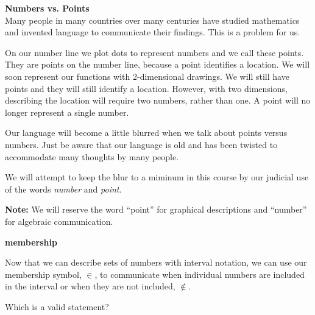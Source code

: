 \documentclass{ximera}
\begin{document}
\begin{warning}  \textbf{\textcolor{red!80!black}{Numbers vs. Points}} \\

Many people in many countries over many centuries have studied mathematics and invented language to communicate their findings. This is a problem for us.

On our number line we plot dots to represent numbers and we call these points.  They are points on the number line, because a point identifies a location.  We will soon represent our functions with 2-dimensional drawings. We will still have points and they will still identify a location.  However, with two dimensions, describing the location will require two numbers, rather than one.  A point will no longer represent a single number.

Our language will become a little blurred when we talk about points versus numbers.  Just be aware that our language is old and has been twisted to accommodate many thoughts by many people.


We will attempt to keep the blur to a miminum in this course by our judicial use of the words \textit{number} and \textit{point}.

\textbf{Note:} We will reserve the word ``point'' for graphical descriptions and ``number'' for algebraic communication.
\end{warning}








\begin{notation}  \textbf{\textcolor{blue!55!black}{membership}} 

Now that we can describe sets of numbers with interval notation, we can use our membership symbol, $\in$, to communicate when individual numbers are included in the interval or when they are not included, $\notin$.

\end{notation}








\begin{question}
Which is a valid statement?
    \begin{multipleChoice}
    \choice {$ 2 \in [3, -2)$}
    \choice [correct]{$-2 \in [-2, 3)$}
    \end{multipleChoice}
\end{question}
\end{document}
